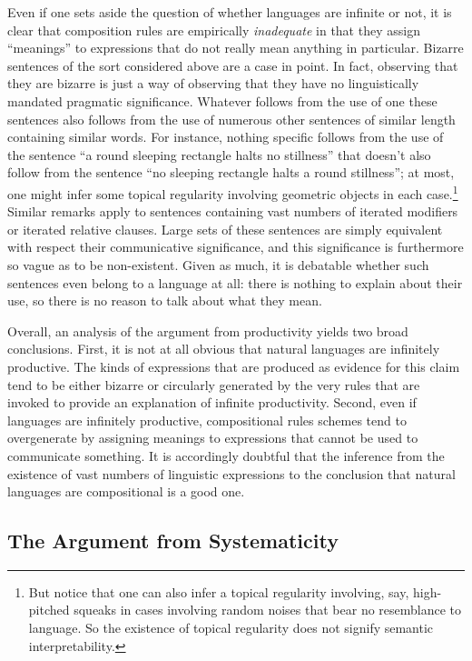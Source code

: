 Even if one sets aside the question of whether languages are infinite or not, it is clear that composition rules are empirically \textit{inadequate} in that they assign ``meanings'' to expressions that do not really mean anything in particular. Bizarre sentences of the sort considered above are a case in point. In fact, observing that they are bizarre is just a way of observing that they have no linguistically mandated pragmatic significance. Whatever follows from the use of one these sentences also follows from the use of numerous other sentences of similar length containing similar words. For instance, nothing specific follows from the use of the sentence ``a round sleeping rectangle halts no stillness'' that doesn't also follow from the sentence ``no sleeping rectangle halts a round stillness''; at most, one might infer some topical regularity involving geometric objects in each case.\footnote{But notice that one can also infer a topical regularity involving, say, high-pitched squeaks in cases involving random noises that bear no resemblance to language. So the existence of topical regularity does not signify semantic interpretability.} Similar remarks apply to sentences containing vast numbers of iterated modifiers or iterated relative clauses. Large sets of these sentences are simply equivalent with respect their communicative significance, and this significance is furthermore so vague as to be non-existent. Given as much, it is debatable whether such sentences even belong to a language at all: there is nothing to explain about their use, so there is no reason to talk about what they mean. 

Overall, an analysis of the argument from productivity yields two broad conclusions. First, it is not at all obvious that natural languages are infinitely productive. The kinds of expressions that are produced as evidence for this claim tend to be either bizarre or circularly generated by the very rules that are invoked to provide an explanation of infinite productivity. Second, even if languages are infinitely productive, compositional rules schemes tend to overgenerate by assigning meanings to expressions that cannot be used to communicate something. It is accordingly doubtful that the inference from the existence of vast numbers of linguistic expressions to the conclusion that natural languages are compositional is a good one. 

\subsection{The Argument from Systematicity}

